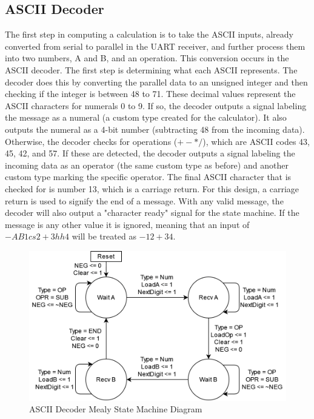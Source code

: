 \documentclass[11pt]{article}
\begin{document}
\subsection{ASCII Decoder}

The first step in computing a calculation is to take the ASCII inputs, already converted from serial to parallel in the UART receiver, and further process them into two numbers, A and B, and an operation.
This conversion occurs in the ASCII decoder.
The first step is determining what each ASCII represents.
The decoder does this by converting the parallel data to an unsigned integer and then checking if the integer is between 48 to 71.
These decimal values represent the ASCII characters for numerals 0 to 9.
If so, the decoder outputs a signal labeling the message as a numeral (a custom type created for the calculator).
It also outputs the numeral as a 4-bit number (subtracting 48 from the incoming data).
Otherwise, the decoder checks for operations ($+-*/$), which are ASCII codes 43, 45, 42, and 57.
If these are detected, the decoder outputs a signal labeling the incoming data as an operator (the same custom type as before) and another custom type marking the specific operator.
The final ASCII character that is checked for is number 13, which is a carriage return.
For this design, a carriage return is used to signify the end of a message.
With any valid message, the decoder will also output a "character ready" signal for the state machine.
If the message is any other value it is ignored, meaning that an input of $-AB1cs 2 + 3 hh4$ will be treated as $-12+34$.


\begin{figure}[H]        
    \centering
    \includegraphics[width=.5\textwidth]{DecoderSM.drawio.png}
    \caption{ASCII Decoder Mealy State Machine Diagram}
    \label{fig:decodersm}
\end{figure} 
\end{document}
